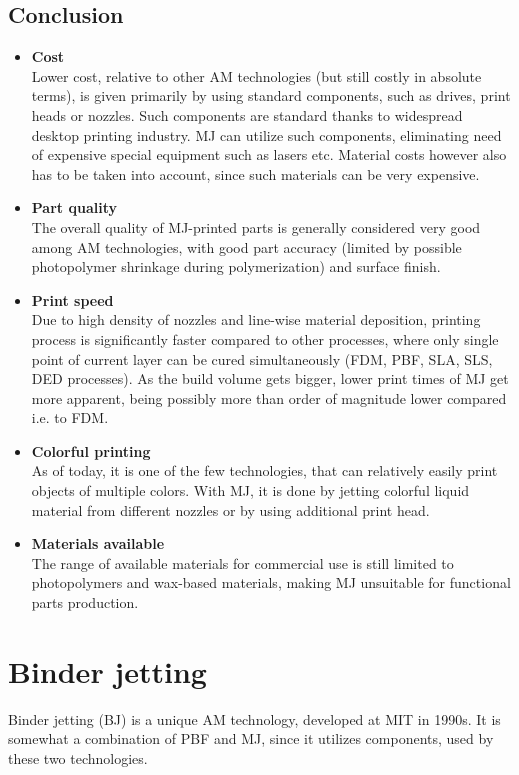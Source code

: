 \documentclass[a4paper, twoside, 11pt]{report}
\newcommand\pro{\item[$+$]}
\newcommand\con{\item[$-$]}
\begin{document}
\section{Conclusion}
\begin{itemize}
\pro \textbf{Cost}\\
Lower cost, relative to other AM technologies (but still costly in absolute terms), is given primarily by using standard components, such as drives, print heads or nozzles. Such components are standard thanks to widespread desktop printing industry. MJ can utilize such components, eliminating need of expensive special equipment such as lasers etc. Material costs however also has to be taken into account, since such materials can be very expensive.

\pro \textbf{Part quality}\\
The overall quality of MJ-printed parts is generally considered very good among AM technologies, with good part accuracy (limited by possible photopolymer shrinkage during polymerization) and surface finish.

\pro \textbf{Print speed}\\
Due to high density of nozzles and line-wise material deposition, printing process is significantly faster compared to other processes, where only single point of current layer can be cured simultaneously (FDM, PBF, SLA, SLS, DED processes). As the build volume gets bigger, lower print times of MJ get more apparent, being possibly more than order of magnitude lower compared i.e. to FDM.

\pro \textbf{Colorful printing}\\
As of today, it is one of the few technologies, that can relatively easily print objects of multiple colors. With MJ, it is done by jetting colorful liquid material from different nozzles or by using additional print head.
\\[10pt]

\con \textbf{Materials available}\\
The range of available materials for commercial use is still limited to photopolymers and wax-based materials, making MJ unsuitable for functional parts production.
\end{itemize}

\chapter{Binder jetting}
Binder jetting (BJ) is a unique AM technology, developed at MIT in 1990s. It is somewhat a combination of PBF and MJ, since it utilizes components, used by these two technologies. 
\end{document}
